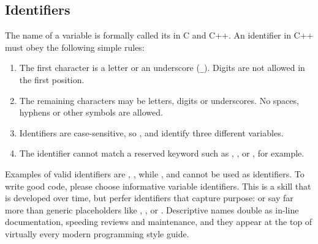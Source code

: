\subsection{Identifiers}
The name of a variable is formally called its  in C and C++.
An identifier in C++ must obey the following simple rules:

\begin{enumerate}
  \item 
  The first character is a letter or an underscore (\texttt{\_}).
  Digits are not allowed in the first position.
  \item 
  The remaining characters may be letters, digits or underscores.
  No spaces, hyphens or other symbols are allowed.
  \item 
  Identifiers are case-sensitive, so ,  and  identify three different variables.
  \item 
  The identifier cannot match a reserved keyword such as , , or , for example.
\end{enumerate}

Examples of valid identifiers are , , while ,  and  cannot be used as identifiers.
To write good code, please choose informative variable identifiers.
This is a skill that is developed over time, but perfer identifiers that capture purpose:  or  say far more than generic placeholders like , , or .
Descriptive names double as in-line documentation, speeding reviews and maintenance, and they appear at the top of virtually every modern programming style guide.

